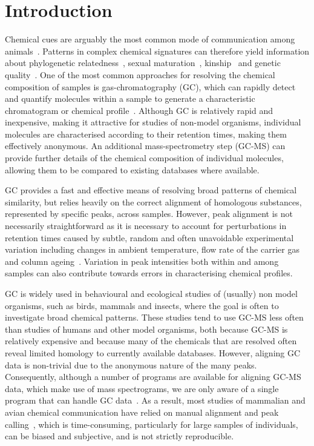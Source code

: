 \documentclass[10pt,letterpaper]{article}
\begin{document}
\section*{Introduction}
Chemical cues are arguably the most common mode of communication among animals~\cite{Wyatt.2014}. Patterns in complex chemical signatures can therefore yield information about phylogenetic relatedness~\cite{Meulemeester.2011}, sexual maturation~\cite{Caspers.2011}, kinship~\cite{Bonadonna.2012, Krause.2012, Stoffel.2015} and genetic quality~\cite{Charpentier.2010, Leclaire.2012, Stoffel.2015}. One of the most common approaches for resolving the chemical composition of samples is gas-chromatography (GC), which can rapidly detect and quantify molecules within a sample to generate a characteristic chromatogram or chemical profile~\cite{McNair.2011}. Although GC is relatively rapid and inexpensive, making it attractive for studies of non-model organisms, individual molecules are characterised according to their retention times, making them effectively anonymous.  An additional mass-spectrometry step (GC-MS) can provide further details of the chemical composition of individual molecules, allowing them to be compared to existing databases where available.\par
GC provides a fast and effective means of resolving broad patterns of chemical similarity, but relies heavily on the correct alignment of homologous substances, represented by specific peaks, across samples. However, peak alignment is not necessarily straightforward as it is necessary to account for perturbations in retention times caused by subtle, random and often unavoidable experimental variation including changes in ambient temperature, flow rate of the carrier gas and column ageing~\cite{Scott.2003, Pierce.2005}.  Variation in peak intensities both within and among samples can also contribute towards errors in characterising chemical profiles. \par
GC is widely used in behavioural and ecological studies of (usually) non model organisms, such as birds, mammals and insects, where the goal is often to investigate broad chemical patterns.  These studies tend to use GC-MS less often than studies of humans and other model organisms, both because GC-MS is relatively expensive and because many of the chemicals that are resolved often reveal limited homology to currently available databases. However, aligning GC data is non-trivial due to the anonymous nature of the many peaks. Consequently, although a number of programs are available for aligning GC-MS data, which make use of mass spectrograms, we are only aware of a single program that can handle GC data~\cite{Dellicour.2013}.  As a result, most studies of mammalian and avian chemical communication have relied on manual alignment and peak calling~\cite{Drea.2013}, which is time-consuming, particularly for large samples of individuals, can be biased and subjective, and is not strictly reproducible. \par
\end{document}
